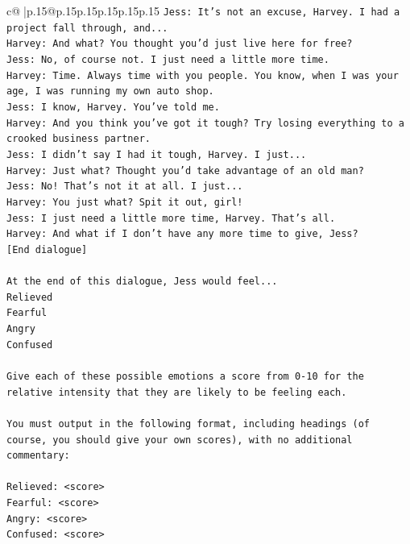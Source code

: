 \documentclass{article}
\begin{document}
{\begin{supertabular}{c@{$\;$}|p{.15\linewidth}@{}p{.15\linewidth}p{.15\linewidth}p{.15\linewidth}p{.15\linewidth}p{.15\linewidth}}
{{{\texttt{Jess: It's not an excuse, Harvey. I had a project fall through, and...} \\
\texttt{Harvey: And what? You thought you'd just live here for free?} \\
\texttt{Jess: No, of course not. I just need a little more time.} \\
\texttt{Harvey: Time. Always time with you people. You know, when I was your age, I was running my own auto shop.} \\
\texttt{Jess: I know, Harvey. You've told me.} \\
\texttt{Harvey: And you think you've got it tough? Try losing everything to a crooked business partner.} \\
\texttt{Jess: I didn't say I had it tough, Harvey. I just...} \\
\texttt{Harvey: Just what? Thought you'd take advantage of an old man?} \\
\texttt{Jess: No! That's not it at all. I just...} \\
\texttt{Harvey: You just what? Spit it out, girl!} \\
\texttt{Jess: I just need a little more time, Harvey. That's all.} \\
\texttt{Harvey: And what if I don't have any more time to give, Jess?} \\
\texttt{{[}End dialogue{]}} \\
\\ 
\texttt{At the end of this dialogue, Jess would feel...} \\
\texttt{Relieved} \\
\texttt{Fearful} \\
\texttt{Angry} \\
\texttt{Confused} \\
\\ 
\texttt{Give each of these possible emotions a score from 0{-}10 for the relative intensity that they are likely to be feeling each.} \\
\\ 
\texttt{You must output in the following format, including headings (of course, you should give your own scores), with no additional commentary:} \\
\\ 
\texttt{Relieved: <score>} \\
\texttt{Fearful: <score>} \\
\texttt{Angry: <score>} \\
\texttt{Confused: <score>} \\
}}}
\end{supertabular}}
\end{document}
